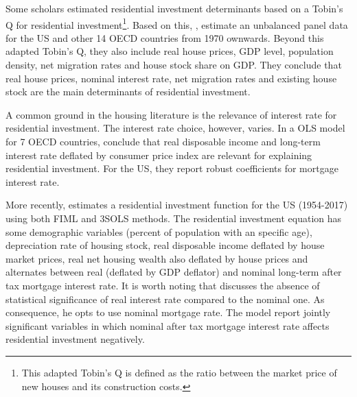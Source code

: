 \documentclass[12pt, a4paper]{article}
\begin{document}
Some scholars estimated residential investment determinants based on a Tobin's Q for residential investment\footnote{This adapted Tobin's Q is defined as the ratio between the market price of new houses and its construction costs.}.
Based on this, \textcite{kohlscheen_2018_Residential}, estimate an unbalanced panel data for the US and other 14 OECD countries from 1970 ownwards.
Beyond this adapted Tobin's Q, they also include real house prices, GDP level, population density, net migration rates and house stock share on GDP.
They conclude that real house prices, nominal interest rate, net migration rates and existing house stock are the main determinants of residential investment.

A common ground in the housing literature is the relevance of interest rate for residential investment.
The interest rate choice, however, varies.
In a OLS model for 7 OECD countries, \textcite{egebo_1990_MODEL} conclude that real disposable income and long-term interest rate deflated by consumer price index are relevant for explaining residential investment.
For the US, they report robust coefficients  for mortgage interest rate.

More recently, \textcite{fair_macroeconometric_2018} estimates a residential investment function for the US (1954-2017) using both FIML and 3SOLS methods.
The residential investment equation has some demographic variables (percent of population with an specific age), depreciation rate of housing stock, real disposable income deflated by house market prices, real net housing wealth also deflated by house prices and alternates between real (deflated by GDP deflator) and nominal long-term after tax mortgage interest rate.
It is worth noting that \textcite{fair_macroeconometric_2018} discusses the absence of statistical significance of real interest rate compared to the nominal one.
As consequence, he opts to use nominal mortgage rate.
The model report jointly significant variables in which nominal after tax mortgage interest rate affects residential investment negatively.
\end{document}
